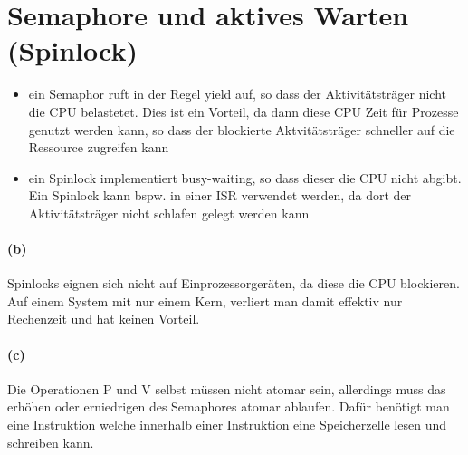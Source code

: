 \documentclass[a4paper]{article}
\begin{document}
\section{Semaphore und aktives Warten (Spinlock)}
\begin{itemize}
    \item ein Semaphor ruft in der Regel yield auf, so dass der Aktivitätsträger nicht die CPU belastetet. Dies ist ein Vorteil, da dann diese CPU Zeit für Prozesse genutzt werden kann, so dass der blockierte Aktvitätsträger schneller auf die Ressource zugreifen kann
    \item ein Spinlock implementiert busy-waiting, so dass dieser die CPU nicht abgibt. Ein Spinlock kann bspw. in einer ISR verwendet werden, da dort der Aktivitätsträger nicht schlafen gelegt werden kann
\end{itemize}

\paragraph{(b)}
Spinlocks eignen sich nicht auf Einprozessorgeräten, da diese die CPU blockieren. Auf einem System mit nur einem Kern, verliert man damit effektiv nur Rechenzeit und hat keinen Vorteil.


\paragraph{(c)}
Die Operationen P und V selbst müssen nicht atomar sein, allerdings muss das erhöhen oder erniedrigen des Semaphores atomar ablaufen. Dafür benötigt man eine Instruktion welche innerhalb einer Instruktion eine Speicherzelle lesen und schreiben kann.
\end{document}
